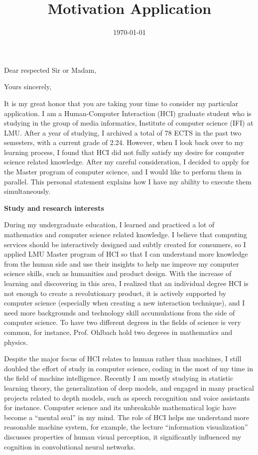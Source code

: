 \documentclass[11pt,a4paper,sans]{moderncv}        %
\title{Motivation Application}
\begin{document}
\date{\today}
\opening{Dear respected Sir or Madam,}
\closing{Yours sincerely,}
\makelettertitle


It is my great honor that you are taking your time to consider my particular application. 
I am a Human-Computer Interaction (HCI) graduate student who is studying in the group of 
media informatics, Institute of computer science (IFI) at LMU. After a year of studying, 
I archived a total of 78 ECTS in the past two semesters, with a current grade of 2.24. 
However, when I look back over to my learning process, I found that HCI did not fully 
satisfy my desire for computer science related knowledge. After my careful consideration, 
I decided to apply for the Master program of computer science, and I would like to perform 
them in parallel. This personal statement explains how I have my ability to execute them 
simultaneously.

\textbf{Study and research interests}

During my undergraduate education, I learned and practiced a lot of mathematics and 
computer science related knowledge. I believe that computing services should be 
interactively designed and subtly created for consumers, so I applied LMU Master program 
of HCI so that I can understand more knowledge from the human side and use their insights 
to help me improve my computer science skills, such as humanities and product design. 
With the increase of learning and discovering in this area, I realized that an individual 
degree HCI is not enough to create a revolutionary product, it is actively supported by 
computer science (especially when creating a new interaction technique), and I need more 
backgrounds and technology skill accumulations from the side of computer science. To have 
two different degrees in the fields of science is very common, for instance, Prof. 
Ohlbach hold two degrees in mathematics and physics.

Despite the major focus of HCI relates to human rather than machines, I still doubled the 
effort of study in computer science, coding in the most of my time in the field of machine 
intelligence. Recently I am mostly studying in statistic learning theory, the 
generalization of deep models, and engaged in many practical projects related to depth 
models, such as speech recognition and voice assistants for instance. Computer science and 
its unbreakable mathematical logic have become a ``mental seal'' in my mind. The role of 
HCI helps me understand more reasonable machine system, for example, the lecture 
``information visualization'' discusses properties of human visual perception, it 
significantly influenced my cognition in convolutional neural networks.
\end{document}
